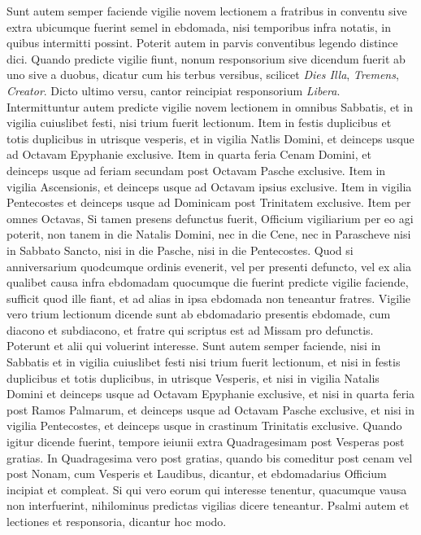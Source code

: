 \documentclass[11pt,openany]{book}
\begin{document}
\begin{multicols*}{2}
Sunt autem semper faciende vigilie novem lectionem a fratribus in conventu sive extra ubicumque fuerint semel in ebdomada, nisi temporibus infra notatis, in quibus intermitti possint. Poterit autem in parvis conventibus legendo distince dici. Quando predicte vigilie fiunt, nonum responsorium sive dicendum fuerit ab uno sive a duobus, dicatur cum his terbus versibus, scilicet \textit{Dies Illa}, \textit{Tremens}, \textit{Creator}. Dicto ultimo versu, cantor reincipiat responsorium \textit{Libera}.
Intermittuntur autem predicte vigilie novem lectionem in omnibus Sabbatis, et in vigilia cuiuslibet festi, nisi trium fuerit lectionum. Item in festis duplicibus et totis duplicibus in utrisque vesperis, et in vigilia Natlis Domini, et deinceps usque ad Octavam Epyphanie exclusive. Item in quarta feria Cenam Domini, et deinceps usque ad feriam secundam post Octavam Pasche exclusive. Item in vigilia Ascensionis, et deinceps usque ad Octavam ipsius exclusive. Item in vigilia Pentecostes et deinceps usque ad Dominicam post Trinitatem exclusive. Item per omnes Octavas, Si tamen presens defunctus fuerit, Officium vigiliarium per eo agi poterit, non tanem in die Natalis Domini, nec in die Cene, nec in Parascheve nisi in Sabbato Sancto, nisi in die Pasche, nisi in die Pentecostes.
Quod si anniversarium quodcumque ordinis evenerit, vel per presenti defuncto, vel ex alia qualibet causa infra ebdomadam quocumque die fuerint predicte vigilie faciende, sufficit quod ille fiant, et ad alias in ipsa ebdomada non teneantur fratres.
Vigilie vero trium lectionum dicende sunt ab ebdomadario presentis ebdomade, cum diacono et subdiacono, et fratre qui scriptus est ad Missam pro defunctis. Poterunt et alii qui voluerint interesse. Sunt autem semper faciende, nisi in Sabbatis et in vigilia cuiuslibet festi nisi trium fuerit lectionum, et nisi in festis duplicibus et totis duplicibus, in utrisque Vesperis, et nisi in vigilia Natalis Domini et deinceps usque ad Octavam Epyphanie exclusive, et nisi in quarta feria post Ramos Palmarum, et deinceps usque ad Octavam Pasche exclusive, et nisi in vigilia Pentecostes, et deinceps usque in crastinum Trinitatis exclusive.
Quando igitur dicende fuerint, tempore ieiunii extra Quadragesimam post Vesperas post gratias. In Quadragesima vero post gratias, quando bis comeditur post cenam vel post Nonam, cum Vesperis et Laudibus, dicantur, et ebdomadarius Officium incipiat et compleat. Si qui vero eorum qui interesse tenentur, quacumque vausa non interfuerint, nihilominus predictas vigilias dicere teneantur. Psalmi autem et lectiones et responsoria, dicantur hoc modo.

\end{multicols*}
\end{document}
